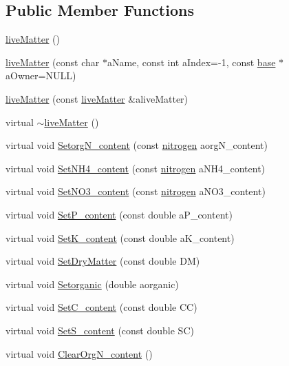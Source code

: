 \subsection*{Public Member Functions}
\begin{DoxyCompactItemize}
\item 
\hyperlink{classlive_matter_aaa245231cc5d955c11ded92f5282d119}{liveMatter} ()
\item 
\hyperlink{classlive_matter_a6fe81bb25ccd78291b831d0b28d591d8}{liveMatter} (const char $\ast$aName, const int aIndex=-\/1, const \hyperlink{classbase}{base} $\ast$aOwner=NULL)
\item 
\hyperlink{classlive_matter_afb5cf140fc63fc56baf5c36498aa1149}{liveMatter} (const \hyperlink{classlive_matter}{liveMatter} \&aliveMatter)
\item 
virtual \hyperlink{classlive_matter_a51b9cba8c15a51acec3c4e1357d1b6f4}{$\sim$liveMatter} ()
\item 
virtual void \hyperlink{classlive_matter_adbb45be219dd863cfad2b5e97cde1508}{SetorgN\_\-content} (const \hyperlink{classnitrogen}{nitrogen} aorgN\_\-content)
\item 
virtual void \hyperlink{classlive_matter_ae1c5d6b2f85882a85817e26a8fc9391f}{SetNH4\_\-content} (const \hyperlink{classnitrogen}{nitrogen} aNH4\_\-content)
\item 
virtual void \hyperlink{classlive_matter_a59f7f829cb7bfe4f8de9d39921d2d63e}{SetNO3\_\-content} (const \hyperlink{classnitrogen}{nitrogen} aNO3\_\-content)
\item 
virtual void \hyperlink{classlive_matter_a52255cdb24978db665475b5f3a4424a8}{SetP\_\-content} (const double aP\_\-content)
\item 
virtual void \hyperlink{classlive_matter_ab290a7267fcd85285cfa72a7eec34adc}{SetK\_\-content} (const double aK\_\-content)
\item 
virtual void \hyperlink{classlive_matter_aee8cb3a1d73625321b1b73dd285dffb4}{SetDryMatter} (const double DM)
\item 
virtual void \hyperlink{classlive_matter_ac88e0a589454e8a1aaef82408d737027}{Setorganic} (double aorganic)
\item 
virtual void \hyperlink{classlive_matter_ac85d49a99a56f9f3e47822ebaf54cbaf}{SetC\_\-content} (const double CC)
\item 
virtual void \hyperlink{classlive_matter_acf54db920b53bc34f1e7878c431ccd0f}{SetS\_\-content} (const double SC)
\item 
virtual void \hyperlink{classlive_matter_a8a0ba23076e0651521207fdc0cf0e11e}{ClearOrgN\_\-content} ()

\end{DoxyCompactItemize}
